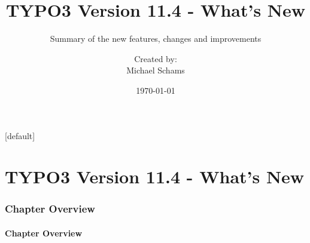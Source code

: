 \documentclass[t]{beamer}
\title{TYPO3 Version 11.4 - What's New}
\subtitle{Summary of the new features, changes and improvements}
\author{
	\centerline{Created by:}
	\centerline{Michael Schams}
}
\date{\today}
\begin{document}
\sharefont


\begingroup
	[default]
	\begin{frame}
		\titlepage
	\end{frame}
\endgroup


\section*{TYPO3 Version 11.4 - What's New}
\begin{frame}[fragile]
	\frametitle{Chapter Overview}
	\framesubtitle{Chapter Overview}

	\tableofcontents

\end{frame}






















\end{document}
